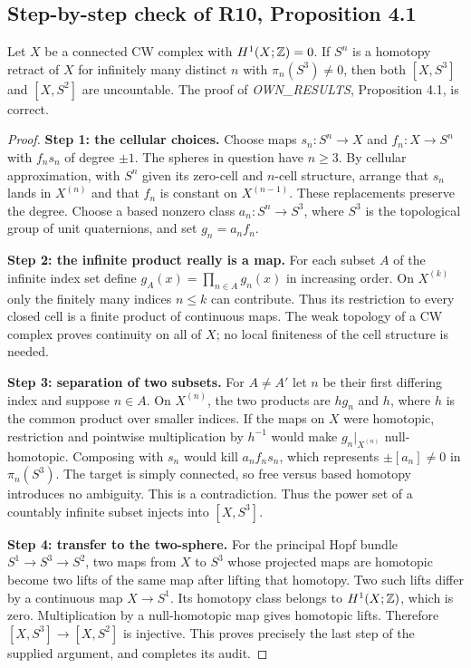 \subsection{Step-by-step check of R10, Proposition 4.1}
\begin{proposition}\label{prop:E-R10-audit}
Let $X$ be a connected CW complex with $H^1(X;\mathbb Z)=0$. If $S^n$ is a
homotopy retract of $X$ for infinitely many distinct $n$ with
$\pi_n(S^3)\ne0$, then both $[X,S^3]$ and $[X,S^2]$ are uncountable.
The proof of \emph{OWN\_RESULTS}, Proposition 4.1, is correct.
\end{proposition}
\begin{proof}
\textbf{Step 1: the cellular choices.} Choose maps
$s_n:S^n\to X$ and $f_n:X\to S^n$ with $f_ns_n$ of degree $\pm1$.
The spheres in question have $n\ge3$. By cellular approximation, with
$S^n$ given its zero-cell and $n$-cell structure, arrange that $s_n$ lands
in $X^{(n)}$ and that $f_n$ is constant on $X^{(n-1)}$.
These replacements preserve the degree. Choose a based nonzero class
$a_n:S^n\to S^3$, where $S^3$ is the topological group of unit quaternions,
and set $g_n=a_nf_n$.

\textbf{Step 2: the infinite product really is a map.}
For each subset $A$ of the infinite index set define
$g_A(x)=\prod_{n\in A}g_n(x)$ in increasing order.
On $X^{(k)}$ only the finitely many indices $n\le k$ can contribute.
Thus its restriction to every closed cell is a finite product of continuous
maps. The weak topology of a CW complex proves continuity on all of $X$;
no local finiteness of the cell structure is needed.

\textbf{Step 3: separation of two subsets.}
For $A\ne A'$ let $n$ be their first differing index and suppose $n\in A$.
On $X^{(n)}$, the two products are $hg_n$ and $h$, where $h$ is the common
product over smaller indices. If the maps on $X$ were homotopic, restriction
and pointwise multiplication by $h^{-1}$ would make
$g_n|_{X^{(n)}}$ null-homotopic. Composing with $s_n$ would kill
$a_nf_ns_n$, which represents $\pm[a_n]\ne0$ in $\pi_n(S^3)$.
The target is simply connected, so free versus based homotopy introduces
no ambiguity. This is a contradiction. Thus the power set of a countably
infinite subset injects into $[X,S^3]$.

\textbf{Step 4: transfer to the two-sphere.}
For the principal Hopf bundle $S^1\to S^3\to S^2$, two maps from $X$ to
$S^3$ whose projected maps are homotopic become two lifts of the same map
after lifting that homotopy. Two such lifts differ by a continuous map
$X\to S^1$. Its homotopy class belongs to $H^1(X;\mathbb Z)$, which is zero.
Multiplication by a null-homotopic map gives homotopic lifts. Therefore
$[X,S^3]\to[X,S^2]$ is injective. This proves precisely the last step of
the supplied argument, and completes its audit.
\end{proof}








